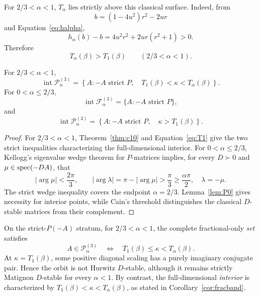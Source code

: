 For \(2/3<\alpha<1\), \(T_\alpha\) lies strictly above this classical surface. Indeed, from
\[
b=(1-4u^2)r^2-2ur
\]
and Equation~\eqref{eq:halpha},
\[
h_\alpha(b)-b
=
4u^2r^2+2ur(r^2+1)>0.
\]
Therefore
\begin{equation}
\boxed{
T_\alpha(\beta)>T_1(\beta)
\qquad(2/3<\alpha<1).
}
\label{eq:strict-gap}
\end{equation}

\begin{Corollary}\label{cor:fracband}
For \(2/3<\alpha<1\),
\begin{equation}
\operatorname{int}\mathcal P_\alpha^{(3)}
=
\left\{
A:
-A\text{ strict }P,\quad
T_1(\beta)<\kappa<T_\alpha(\beta)
\right\}.
\label{eq:fractional-band}
\end{equation}
For \(0<\alpha\le2/3\),
\begin{equation}
\operatorname{int}\mathcal F_\alpha^{(3)}
=
\{A:-A\text{ strict }P\},
\label{eq:low-order-F}
\end{equation}
and
\begin{equation}
\operatorname{int}\mathcal P_\alpha^{(3)}
=
\left\{
A:
-A\text{ strict }P,\quad
\kappa>T_1(\beta)
\right\}.
\label{eq:low-order-P}
\end{equation}
\end{Corollary}

\begin{proof}
For \(2/3<\alpha<1\), Theorem~\ref{thm:c10} and
Equation~\eqref{eq:T1} give the two strict inequalities
characterizing the full-dimensional interior.
For \(0<\alpha\le2/3\), Kellogg's eigenvalue wedge theorem
for \(P\)-matrices \cite{Kellogg1972} implies, for every
\(D\succ0\) and \(\mu\in\operatorname{spec}(-DA)\), that
\[
 |\arg\mu|<\frac{2\pi}{3},
 \qquad
 |\arg\lambda|=\pi-|\arg\mu|>\frac{\pi}{3}
 \ge\frac{\alpha\pi}{2},
 \quad \lambda=-\mu.
\]
The strict wedge inequality covers the endpoint \(\alpha=2/3\).
Lemma~\ref{lem:P0} gives necessity for interior points,
while Cain's threshold distinguishes the classical
\(D\)-stable matrices from their complement.
\end{proof}

\begin{Remark}
\label{rem:fracband-boundary}
On the strict-\(P(-A)\) stratum, for \(2/3<\alpha<1\),
the complete fractional-only \emph{set} satisfies
\[
 A\in\mathcal P_\alpha^{(3)}
 \quad\Longleftrightarrow\quad
 T_1(\beta)\le\kappa<T_\alpha(\beta).
\]
At \(\kappa=T_1(\beta)\), some positive diagonal scaling
has a purely imaginary conjugate pair. Hence the orbit is
not Hurwitz \(D\)-stable, although it remains strictly
Matignon \(D\)-stable for every \(\alpha<1\).
By contrast, the full-dimensional \emph{interior} is
characterized by \(T_1(\beta)<\kappa<T_\alpha(\beta)\),
as stated in Corollary~\ref{cor:fracband}.
\end{Remark}

